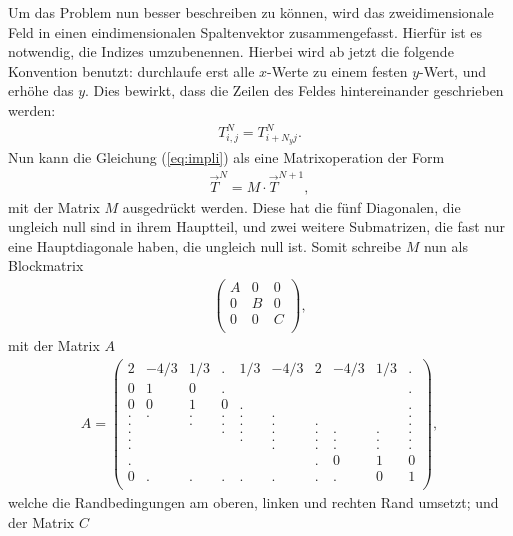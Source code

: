 \documentclass[12pt,a4paper,titlepage,headinclude,bibtotoc]{scrartcl}
\begin{document}
Um das Problem nun besser beschreiben zu können, wird das zweidimensionale Feld in einen eindimensionalen Spaltenvektor zusammengefasst. Hierfür ist es notwendig, die Indizes umzubenennen. Hierbei wird ab jetzt die folgende Konvention benutzt: durchlaufe erst alle $x$-Werte zu einem festen $y$-Wert, und erhöhe das $y$. Dies bewirkt, dass die Zeilen des Feldes hintereinander geschrieben werden:
\begin{align*}
T_{i,j}^{N} = T_{i+N_y j}^{N}.
\end{align*}
Nun kann die Gleichung (\ref{eq:impli}) als eine Matrixoperation der Form
\begin{align*}
\vec{T}^N = M \cdot \vec{T}^{N+1},
\end{align*} 
mit der Matrix $M$ ausgedrückt werden.
Diese hat die fünf Diagonalen, die ungleich null sind in ihrem Hauptteil, und zwei weitere Submatrizen, die fast nur eine Hauptdiagonale haben, die ungleich null ist.
Somit schreibe $M$ nun als Blockmatrix
\begin{align*}
   \begin{pmatrix}
  A  & 0 & 0 \\
  0  & B & 0 \\
  0  & 0 & C \\
 \end{pmatrix}
 ,
\end{align*}
mit der Matrix $A$ 
\begin{align*}
A =
  \begin{pmatrix}
  2  & -4/3 & 1/3 & . & 1/3 & -4/3 & 2 & -4/3 & 1/3 & .\\
  0  & 1 & 0 & . &   &   &   &   &   & . \\
  0  & 0 & 1 & 0 & . &   &   &   &   & . \\
  .  & . & . & . & . & . &   &   &   & . \\
  .  &   & . & . & . & . & . &   &   & . \\
  .  &   &   & . & . & . & . & . & . & . \\
  .  &   &   &   & . & . & . & . & . & . \\
  .  &   &   &   &   & . & . & . & . & . \\
  .  &   &   &   &   &   & . & 0 & 1 & 0 \\
  0  & . & . & . & . & . & . & . & 0 & 1 \\
 \end{pmatrix}
 ,
 \end{align*}
 welche die Randbedingungen am oberen, linken und rechten Rand umsetzt; und der Matrix $C$
\end{document}
